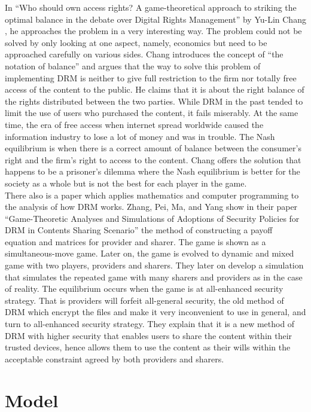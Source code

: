 \documentclass[a4paper,12pt]{article}
\numberwithin{equation}{section}
\begin{document}
In ``Who should own access rights? A game-theoretical approach to striking the optimal balance in the debate over Digital Rights Management'' by Yu-Lin Chang \cite{chang2007}, he approaches the problem in a very interesting way. The problem could not be solved by only looking at one aspect, namely, economics but need to be approached carefully on various sides. Chang introduces the concept of ``the notation of balance'' and argues that the way to solve this problem of implementing DRM is neither to give full restriction to the firm nor totally free access of the content to the public. He claims that it is about the right balance of the rights distributed between the two parties. While DRM in the past tended to limit the use of users who purchased the content, it fails miserably. At the same time, the era of free access when internet spread worldwide caused the information industry to lose a lot of money and was in trouble. The Nash equilibrium is when there is a correct amount of balance between the consumer’s right and the firm’s right to access to the content. Chang offers the solution that happens to be a prisoner’s dilemma where the Nash equilibrium is better for the society as a whole but is not the best for each player in the game.\\

There also is a paper which applies mathematics and computer programming to the analysis of how DRM works. Zhang, Pei, Ma, and Yang show in their paper ``Game-Theoretic Analyses and Simulations of Adoptions of Security Policies for DRM in Contents Sharing Scenario'' \cite{zhang2011} the method of constructing a payoff equation and matrices for provider and sharer. The game is shown as a simultaneous-move game. Later on, the game is evolved to dynamic and mixed game with two players, providers and sharers. They later on develop a simulation that simulates the repeated game with many sharers and providers as in the case of reality. The equilibrium occurs when the game is at all-enhanced security strategy. That is providers will forfeit all-general security, the old method of DRM which encrypt the files and make it very inconvenient to use in general, and turn to all-enhanced security strategy. They explain that it is a new method of DRM with higher security that enables users to share the content within their trusted devices, hence allows them to use the content as their wills within the acceptable constraint agreed by both providers and sharers.

\section{Model}
\end{document}
